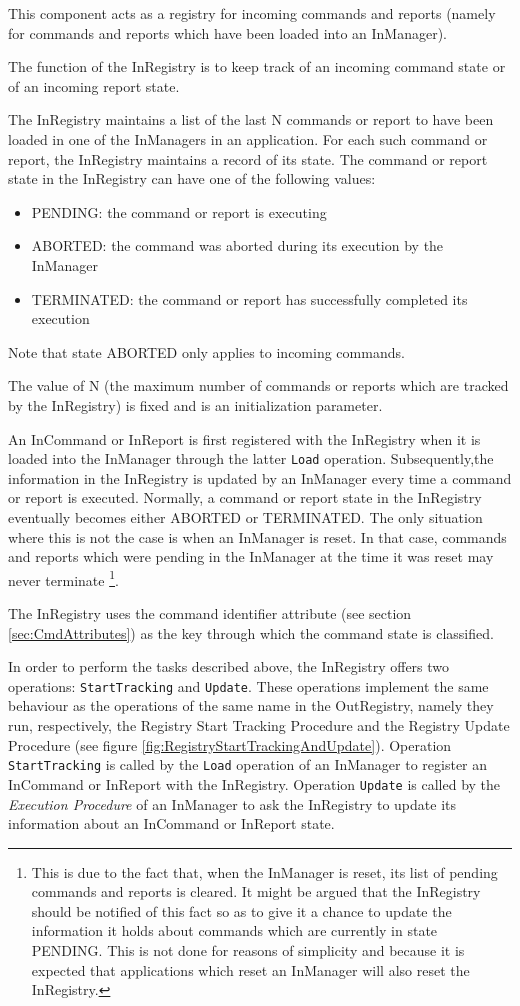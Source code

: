 This component acts as a registry for incoming commands and reports (namely for commands and reports which have been loaded into an InManager).

The function of the InRegistry is to keep track of an incoming command state or of an incoming report state.

The InRegistry maintains a list of the last N commands or report to have been loaded in one of the InManagers in an application. For each such command or report, the InRegistry maintains a record of its state. The command or report state in the InRegistry can have one of the following values:
\begin{itemize}
\item PENDING: the command or report is executing
\item ABORTED: the command was aborted during its execution by the InManager
\item TERMINATED: the command or report has successfully completed its execution
\end{itemize}
Note that state ABORTED only applies to incoming commands.

The value of N (the maximum number of commands or reports which are tracked by the InRegistry) is fixed and is an initialization parameter.

An InCommand or InReport is first registered with the InRegistry when it is loaded into the InManager through the latter \texttt{Load} operation. Subsequently,the information in the InRegistry is updated by an InManager every time a command or report is executed. Normally, a command or report state in the InRegistry eventually becomes either ABORTED or TERMINATED. The only situation where this is not the case is when an InManager is reset. In that case, commands and reports which were pending in the InManager at the time it was reset may never terminate \footnote{This is due to the fact that, when the InManager is reset, its list of pending commands and reports is cleared. It might be argued that the InRegistry should be notified of this fact so as to give it a chance to update the information it holds about commands which are currently in state PENDING. This is not done for reasons of simplicity and because it is expected that applications which reset an InManager will also  reset the InRegistry.}.

The InRegistry uses the command identifier attribute (see section \ref{sec:CmdAttributes}) as the key through which the command state is classified.

In order to perform the tasks described above, the InRegistry offers two operations: \texttt{StartTracking} and \texttt{Update}. These operations implement the same behaviour as the operations of the same name in the OutRegistry, namely they run, respectively, the Registry Start Tracking Procedure and the Registry Update Procedure (see figure \ref{fig:RegistryStartTrackingAndUpdate}). Operation \texttt{StartTracking} is called by the \texttt{Load} operation of an InManager to register an InCommand or InReport with the InRegistry. Operation \texttt{Update} is called by the \textit{Execution Procedure} of an InManager to ask the InRegistry to update its information about an InCommand or InReport state.

